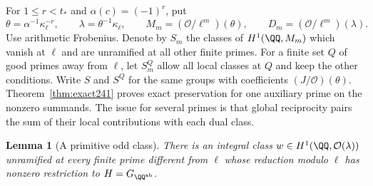 \documentclass[a4paper,11pt]{article}
\newtheorem{lemma}[proposition]{Lemma}
\theoremstyle{definition}
\theoremstyle{remark}
\numberwithin{equation}{section}
\newcommand{\OO}{\mathcal O}
\begin{document}
For \(1\le r<t_*\) and \(\alpha(c)=(-1)^r\), put
\[
  \theta=\alpha^{-1}\kappa_\ell^{-r},\qquad
  \lambda=\theta^{-1}\kappa_\ell,\qquad
  M_m=(\OO/\ell^m)(\theta),\qquad D_m=(\OO/\ell^m)(\lambda).
\]
Use arithmetic Frobenius. Denote by \(S_m\) the classes of
\(H^1(\QQ,M_m)\) which vanish at \(\ell\) and are unramified at all
other finite primes. For a finite set \(Q\) of good primes away from
\(\ell\), let \(S_m^Q\) allow all local classes at \(Q\) and keep
the other conditions. Write \(S\) and \(S^Q\) for the same groups
with coefficients \((J/\OO)(\theta)\). Theorem~\ref{thm:exact241}
proves exact preservation for one auxiliary prime on the nonzero
summands. The issue for several primes is that global reciprocity
pairs the sum of their local contributions with each dual class.

\begin{lemma}[A primitive odd class]\label{lem:oddprimitive617}
There is an integral class \(w\in H^1(\QQ,\OO(\lambda))\) unramified
at every finite prime different from \(\ell\) whose reduction modulo
\(\ell\) has nonzero restriction to \(H=G_{\QQ^{\rm ab}}\).
\end{lemma}
\end{document}
